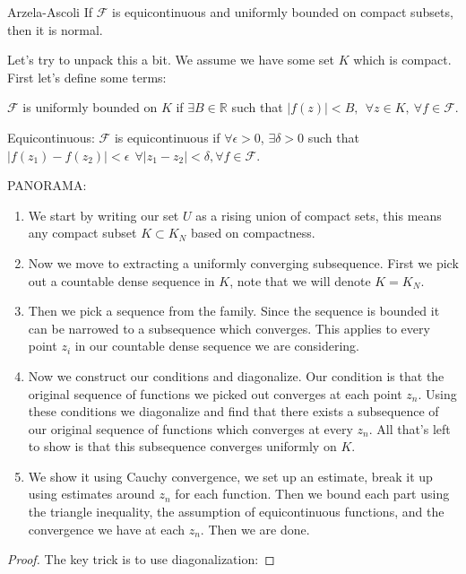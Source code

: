 \documentclass{article}
\begin{document}
\begin{thrm}{Arzela-Ascoli}{}
If \( \mathcal{F} \) is equicontinuous and uniformly bounded on compact subsets, then it is normal. 

\tcbline

Let's try to unpack this a bit. We assume we have some set \( K \) which is compact. First let's define some terms:

\( \mathcal{F}   \) is uniformly bounded on \( K \) if \( \exists B \in \mathbb{R}  \) such that \( |f(z)| < B, \ \ \forall z\in K, \ \forall f\in \mathcal{F} \). 

Equicontinuous: \( \mathcal{F}   \) is equicontinuous if \( \forall \epsilon >0 \), \( \exists \delta >0 \)    such that \( \left\lvert f(z_1) - f(z_2) \right\rvert < \epsilon \ \ \forall |z_{1}- z_2| < \delta, \forall f \in \mathcal{F}    \).  

\quad

PANORAMA:
\begin{enumerate}[]
    \item We start by writing our set \( U \) as a rising union of compact sets, this means any compact subset \( K \subset K_{N} \) based on compactness.
    \item Now we move to extracting a uniformly converging subsequence. First we pick out a countable dense sequence in \( K \), note that we will denote \( K = K_{N}  \).
    \item Then we pick a sequence from the family. Since the sequence is bounded it can be narrowed to a subsequence which converges. This applies to every point \( z_{i}  \) in our countable dense sequence we are considering. 
    \item Now we construct our conditions and diagonalize. Our condition is that the original sequence of functions we picked out converges at each point \( z_{n}  \). Using these conditions we diagonalize and find that there exists a subsequence of our original sequence of functions which converges at every \( z_{n}  \). All that's left to show is that this subsequence converges uniformly on \( K \). 
    \item We show it using Cauchy convergence, we set up an estimate, break it up using estimates around \( z_{n}  \) for each function. Then we bound each part using the triangle inequality, the assumption of equicontinuous functions, and the convergence we have at each \( z_{n}  \). Then we are done. 
\end{enumerate}


\begin{proof}
The key trick is to use diagonalization: 


\end{proof}
\end{thrm}
\end{document}
